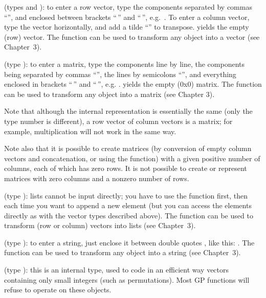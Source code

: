  (types
 and ): to enter a row vector, type the components
separated by commas ``\kbd{,}'', and enclosed between brackets
``\kbd{[}$\,$'' and ``$\,$\kbd{]}'', e.g.~\kbd{[1,2,3]}. To enter a column
vector, type the vector horizontally, and add a tilde ``\til'' to
transpose. \kbd{[ ]} yields the empty (row) vector. The function 
can be used to transform any object into a vector (see Chapter~3).

 (type ): to enter a matrix, type
the components line by line, the components being separated by commas
``\kbd{,}'', the lines by semicolons ``\kbd{;}'', and everything enclosed
in brackets ``\kbd{[}$\,$'' and ``$\,$\kbd{]}'', e.g. \kbd{[x,y; z,t;
u,v]}. \kbd{[ ; ]} yields the empty (0x0) matrix. The function 
can be used to transform any object into a matrix (see Chapter 3).

Note that although the internal representation is essentially the same (only
the type number is different), a row vector of column vectors is 
a matrix; for example, multiplication will not work in the same way.

Note also that it is possible to create matrices (by conversion of empty
column vectors and concatenation, or using the  function) with a
given positive number of columns, each of which has zero rows. It is not
possible to create or represent matrices with zero columns and a nonzero
number of rows.

 (type ): lists cannot be input
directly; you have to use the function  first, then
 each time you want to append a new element (but you can
access the elements directly as with the vector types described above). The
function  can be used to transform (row or column) vectors into
lists (see Chapter~3).

 (type ):
to enter a string, just enclose it between double quotes , like
this: . The function  can be used to
transform any object into a string (see Chapter~3).

 (type ): this is an internal type,
used to code in an efficient way vectors containing only small integers (such
as permutations). Most GP functions will refuse to operate on these objects.

